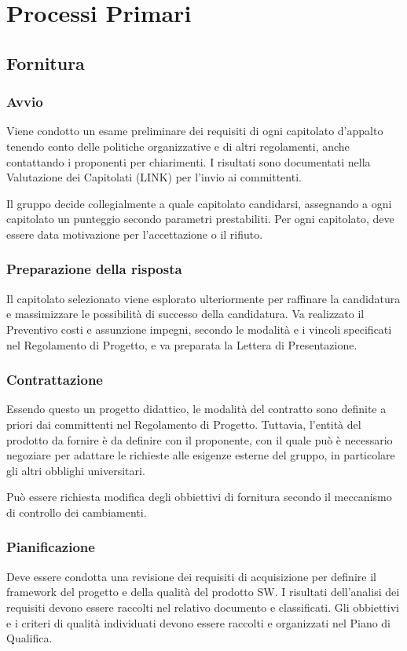\documentclass[12pt, a4paper]{article}
\begin{document}
\section{Processi Primari}

\subsection{Fornitura}
\subsubsection{Avvio}
Viene condotto un esame preliminare dei requisiti di ogni capitolato d'appalto tenendo conto delle politiche organizzative e di altri regolamenti, anche contattando i proponenti per chiarimenti. I risultati sono documentati nella Valutazione dei Capitolati (LINK) per l'invio ai committenti.

Il gruppo decide collegialmente a quale capitolato candidarsi, assegnando a ogni capitolato un punteggio secondo parametri prestabiliti. Per ogni capitolato, deve essere data motivazione per l'accettazione o il rifiuto.

\subsubsection{Preparazione della risposta}
Il capitolato selezionato viene esplorato ulteriormente per raffinare la candidatura e massimizzare le possibilità di successo della candidatura. Va realizzato il Preventivo costi e assunzione impegni, secondo le modalità e i vincoli specificati nel Regolamento di Progetto, e va preparata la Lettera di Presentazione.

\subsubsection{Contrattazione}
Essendo questo un progetto didattico, le modalità del contratto sono definite a priori dai committenti nel Regolamento di Progetto. Tuttavia, l'entità del prodotto da fornire è da definire con il proponente, con il quale può è necessario negoziare per adattare le richieste alle esigenze esterne del gruppo, in particolare gli altri obblighi universitari.

Può essere richiesta modifica degli obbiettivi di fornitura secondo il meccanismo di controllo dei cambiamenti.

\subsubsection{Pianificazione}
Deve essere condotta una revisione dei requisiti di acquisizione per definire il framework del progetto e della qualità del prodotto SW. I risultati dell'analisi dei requisiti devono essere raccolti nel relativo documento e classificati. Gli obbiettivi e i criteri di qualità individuati devono essere raccolti e organizzati nel Piano di Qualifica.
\end{document}
